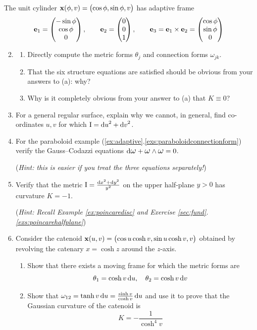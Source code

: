 \begin{exercises}{}{}
\exstart The unit cylinder ${\mathbf{x}}(\phi,v)=\bigl(\cos\phi,\sin\phi,v\bigr)$ has adaptive frame
\[{\mathbf{e}}_1=\begin{pmatrix}-\sin\phi\\\cos\phi\\0\end{pmatrix},\qquad {\mathbf{e}}_2=\begin{pmatrix}0\\0\\1\end{pmatrix},\qquad {\mathbf{e}}_3={\mathbf{e}}_1\times{\mathbf{e}}_2=\begin{pmatrix}\cos\phi\\\sin\phi\\0\end{pmatrix}\]
\begin{enumerate}\setcounter{enumi}{1}
  \item[]\begin{enumerate} 
    \item Directly compute the metric forms $\theta_j$ and connection forms $\omega_{jk}$.
    \item That the six structure equations are satisfied should be obvious from your answers to (a): why? 
    \item Why is it completely obvious from your answer to (a) that $K\equiv 0$?
  \end{enumerate}
  
  \item For a general regular surface, explain why we cannot, in general, find co-ordinates $u,v$ for which $\mathrm{I}={\mathrm{d} u}^2+{\mathrm{d} v}^2$.
  
  
  \item For the paraboloid example (\ref*{ex:adaptive}.\ref{exs:paraboloidconnectionform}) verify the Gauss--Codazzi equations $\D\lomega+\lomega\wedge\lomega=0$.\par
  (\emph{Hint: this is easier if you treat the three equations separately!}) 
  
  
  \item Verify that the metric $\mathrm{I}=\frac{{\mathrm{d} x}^2+{\mathrm{d} y}^2}{y^2}$ on the upper half-plane $y>0$ has curvature $K=-1$.\par
  (\emph{Hint: Recall Example \ref{ex:poincaredisc} and Exercise \ref*{sec:fund}.\ref{exs:poincarehalfplane}})
  

\item\label{exs:catenoidgauss} Consider the catenoid ${\mathbf{x}}(u,v)=\bigl(\cos u\cosh v,\sin u\cosh v,v\bigr)$ obtained by revolving the catenary $x=\cosh z$ around the $z$-axis.
	\begin{enumerate}
	  \item Show that there exists a moving frame for which the metric forms are
	  \[\theta_1=\cosh v\,{\mathrm{d} u},\quad \theta_2=\cosh v\,{\mathrm{d} v}\]
	  \item Show that $\omega_{12}=\tanh v\,{\mathrm{d} u} =\frac{\sinh v}{\cosh v}\,{\mathrm{d} u}$ and use it to prove that the Gaussian curvature of the catenoid is
	  \[K=-\frac 1{\cosh^4v}\]
	\end{enumerate}
	

\end{enumerate}
\end{exercises}
